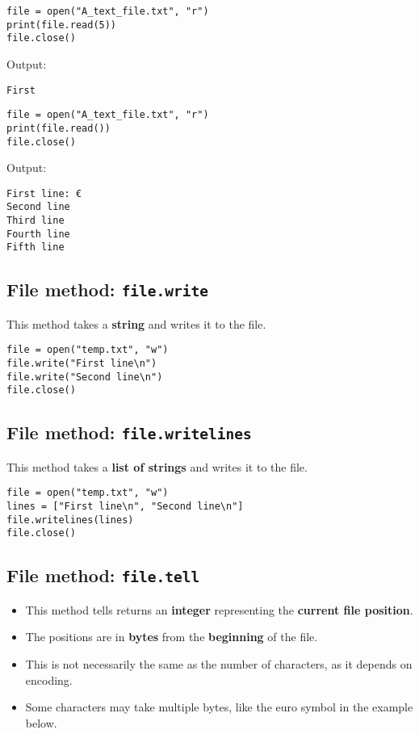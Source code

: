 \documentclass[11pt]{article}
\begin{document}
\begin{verbatim}
file = open("A_text_file.txt", "r")
print(file.read(5))
file.close()
\end{verbatim}

 \noindent Output:

\begin{verbatim}
First
\end{verbatim}


\begin{verbatim}
file = open("A_text_file.txt", "r")
print(file.read())
file.close()
\end{verbatim}

 \noindent Output:

\begin{verbatim}
First line: €
Second line
Third line
Fourth line
Fifth line

\end{verbatim}

\subsection{File method: \texttt{file.write}}
\label{sec:org40d4adb}
This method takes a \textbf{string} and writes it to the file.
\begin{verbatim}
file = open("temp.txt", "w")
file.write("First line\n")
file.write("Second line\n")
file.close()
\end{verbatim}

\subsection{File method: \texttt{file.writelines}}
\label{sec:org077863c}
This method takes a \textbf{list of strings} and writes it to the file.
\begin{verbatim}
file = open("temp.txt", "w")
lines = ["First line\n", "Second line\n"]
file.writelines(lines)
file.close()
\end{verbatim}

\subsection{File method: \texttt{file.tell}}
\label{sec:org292bbd9}
\begin{itemize}
\item This method tells returns an \textbf{integer} representing the \textbf{current file position}.
\item The positions are in \textbf{bytes} from the \textbf{beginning} of the file.
\item This is not necessarily the same as the number of characters, as it depends on encoding.
\item Some characters may take multiple bytes, like the euro symbol in the example below.
\end{itemize}
\end{document}
